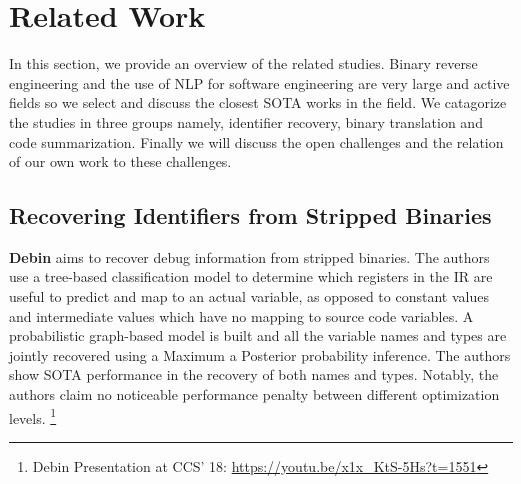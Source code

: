 \chapter{Related Work}
\label{relatedWork}
In this section, we provide an overview of the related studies. 
Binary reverse engineering and the use of NLP for software engineering are very large and active fields so we select and discuss the closest SOTA works in the field. We catagorize the studies in three groups namely, identifier recovery, binary translation and code summarization. Finally we will discuss the open challenges and the relation of our own work to these challenges. 

\section{Recovering Identifiers from Stripped Binaries}
\textbf{Debin} \cite{Debin} aims to recover debug information from stripped binaries. The authors use a tree-based classification model to determine which registers in the IR are useful to predict and map to an actual variable, as opposed to constant values and intermediate values which have no mapping to source code variables. A probabilistic graph-based model is built and all the variable names and types are jointly recovered using a Maximum a Posterior probability inference. The authors show SOTA performance in the recovery of both names and types. Notably, the authors claim no noticeable performance penalty between different optimization levels. \footnote{Debin Presentation at CCS' 18: \url{https://youtu.be/x1x_KtS-5Hs?t=1551}} 

